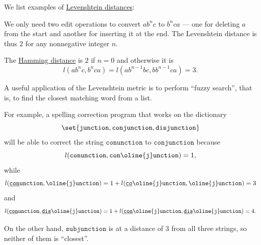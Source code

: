 \begin{example}\label{ex:def:levenshtein_distance}
  We list examples of \hyperref[def:levenshtein_distance]{Levenshtein distances}:
  \begin{thmenum}
     We only need two edit operations to convert \( a b^n c \) to \( b^n c a \) --- one for deleting \( a \) from the start and another for inserting it at the end. The Levenshtein distance is thus \( 2 \) for any nonnegative integer \( n \).

    The \hyperref[def:hamming_distance]{Hamming distance} is \( 2 \) if \( n = 0 \) and otherwise it is
    \begin{equation*}
      l(a b^n c, b^n c a) = l(a b^{n-1} b c, b b^{n-1} c a) = 3.
    \end{equation*}

     A useful application of the Levenshtein metric is to perform \enquote{fuzzy search}, that is, to find the closest matching word from a list.

    For example, a spelling correction program that works on the dictionary
    \begin{equation*}
      \set{ \texttt{junction}, \texttt{conjunction}, \texttt{disjunction} }
    \end{equation*}
    will be able to correct the string \( \texttt{conunction} \) to \( \texttt{conjunction} \) because
    \begin{equation*}
      l(\texttt{conunction}, \texttt{con}\oline{\texttt{j}}\texttt{unction}) = 1,
    \end{equation*}
    while
    \begin{equation*}
      l(\underline{\texttt{con}}\texttt{unction}, \oline{\texttt{j}}\texttt{unction}) = 1 + l(\underline{\texttt{co}}\oline{\texttt{j}}\texttt{unction}, \oline{\texttt{j}}\texttt{unction}) = 3
    \end{equation*}
    and
    \begin{equation*}
      l(\underline{\texttt{con}}\texttt{unction}, \underline{\texttt{dis}}\oline{\texttt{j}}\texttt{unction}) = 1 + l(\underline{\texttt{con}}\oline{\texttt{j}}\texttt{unction}, \underline{\texttt{dis}}\oline{\texttt{j}}\texttt{unction}) = 4.
    \end{equation*}

    On the other hand, \( \texttt{subjunction} \) is at a distance of \( 3 \) from all three strings, so neither of them is \enquote{closest}.
  \end{thmenum}
\end{example}

